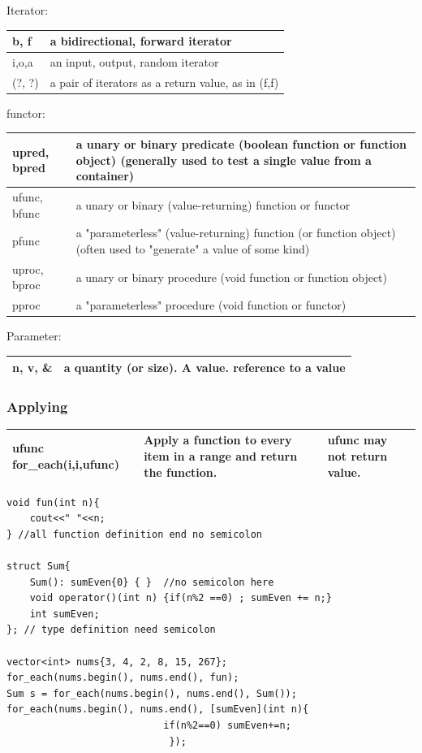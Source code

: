 \documentclass[a4paper,11pt,twoside]{book}
\newcommand{\tophline}{\hline }
\newcommand{\bottomhline}{\\ \hline }
\newcommand{\tophline}{ }
\newcommand{\bottomhline}{ }
\begin{document}
Iterator:  \\
\begin{tabular}{| p{} |p{}|}
\tophline b, f &	a bidirectional, forward iterator \\
\tophline i,o,a 	&an input, output, random iterator  \\
\tophline(?, ?)	&a pair of iterators as a return value, as in (f,f) \bottomhline
\end{tabular}

functor:  \\
\begin{tabular}{| p{} |p{}|}
\tophline upred, bpred	& a unary or binary predicate (boolean function or function object)
(generally used to test a single value from a container) \\

\tophline ufunc, bfunc	&  a unary or binary  (value-returning) function or functor \\
\tophline pfunc	& a "parameterless" (value-returning) function (or function object)
(often used to "generate" a value of some kind) \\
\tophline uproc, bproc	& a unary or binary  procedure (void function or function object) \\
\tophline pproc	&  a "parameterless" procedure (void function or functor) \bottomhline
\end{tabular}

Parameter:  \\
\begin{tabular}{| p{} |p{}|}
\tophline n, v, \&  & 	a quantity (or size). A value. reference to a value \bottomhline
\end{tabular}

\subsubsection{Applying}
\begin{tabular}{| p{} |p{}|p{}|}
\tophline ufunc for\_each(i,i,ufunc) &Apply a function to every item in a range and return the function. &  ufunc may not return value. 
\bottomhline
\end{tabular}

\begin{lstlisting}[numbers=none]
void fun(int n){
    cout<<" "<<n;
} //all function definition end no semicolon

struct Sum{
    Sum(): sumEven{0} { }  //no semicolon here
    void operator()(int n) {if(n%2 ==0) ; sumEven += n;}
    int sumEven;
}; // type definition need semicolon

vector<int> nums{3, 4, 2, 8, 15, 267};
for_each(nums.begin(), nums.end(), fun);
Sum s = for_each(nums.begin(), nums.end(), Sum());
for_each(nums.begin(), nums.end(), [sumEven](int n){
                           if(n%2==0) sumEven+=n;
                            });
\end{lstlisting}
\end{document}
